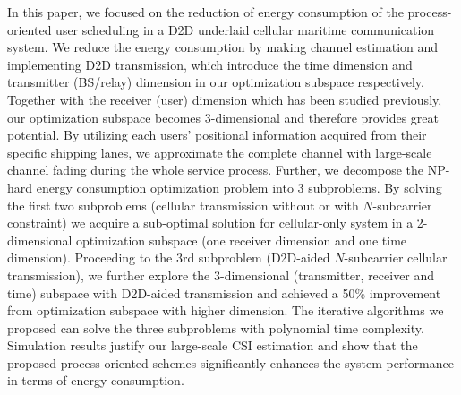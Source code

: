 \documentclass{ieeeaccess}
\begin{document}
In this paper, we focused on the reduction of energy consumption of the process-oriented user scheduling in a D2D underlaid cellular maritime communication system. 
We reduce the energy consumption by making channel estimation and implementing D2D transmission, which introduce the time dimension and transmitter (BS/relay) dimension in our optimization subspace respectively. Together with the receiver (user) dimension which has been studied previously, our optimization subspace becomes 3-dimensional and therefore provides great potential. 
By utilizing each users' positional information acquired from their specific shipping lanes, we approximate the complete channel with large-scale channel fading during the whole service process. Further, we decompose the NP-hard energy consumption optimization problem into 3 subproblems. By solving the first two subproblems (cellular transmission without or with $N$-subcarrier constraint) we acquire a sub-optimal solution for cellular-only system in a 2-dimensional optimization subspace (one receiver dimension and one time dimension). Proceeding to the 3rd subproblem (D2D-aided $N$-subcarrier cellular transmission), we further explore the 3-dimensional (transmitter, receiver and time) subspace with D2D-aided transmission and achieved a 50\% improvement from optimization subspace with higher dimension. The iterative algorithms we proposed can solve the three subproblems with polynomial time complexity. Simulation results justify our large-scale CSI estimation and show that the proposed process-oriented schemes significantly enhances the system performance in terms of energy consumption.
\end{document}
